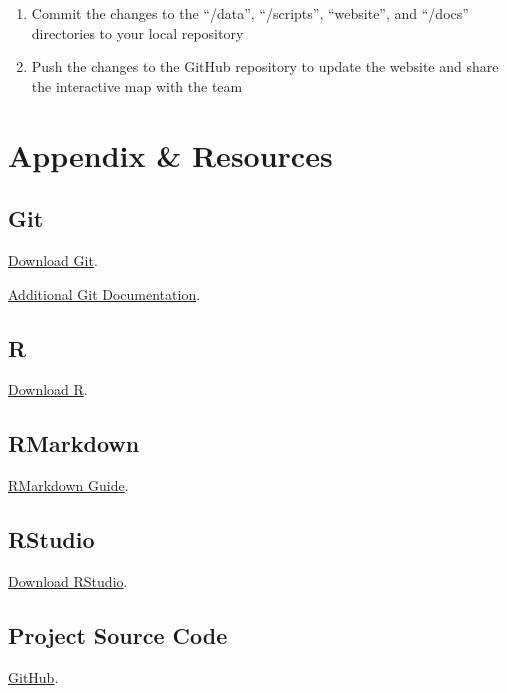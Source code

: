 \documentclass[
]{book}
\begin{document}
\begin{enumerate}
\item
  Commit the changes to the ``/data'', ``/scripts'', ``website'', and ``/docs'' directories to your local repository
\item
  Push the changes to the GitHub repository to update the website and share the interactive map with the team
\end{enumerate}

\hypertarget{appendix-resources}{%
\chapter*{Appendix \& Resources}\label{appendix-resources}}

\hypertarget{git}{%
\section*{Git}\label{git}}

\href{https://git-scm.com/downloads}{Download Git}.

\href{https://git-scm.com/doc}{Additional Git Documentation}.

\hypertarget{r}{%
\section*{R}\label{r}}

\href{https://cloud.r-project.org/}{Download R}.

\hypertarget{rmarkdown}{%
\section*{RMarkdown}\label{rmarkdown}}

\href{https://bookdown.org/yihui/rmarkdown/}{RMarkdown Guide}.

\hypertarget{rstudio}{%
\section*{RStudio}\label{rstudio}}

\href{https://rstudio.com/products/rstudio/download/\#download}{Download RStudio}.

\hypertarget{project-source-code}{%
\section*{Project Source Code}\label{project-source-code}}

\href{https://github.com/Peter-Kedron/COVID-19-Digital-Contact-Tracing-and-Geospatial-Technologies-and-Privacy}{GitHub}.

  
\end{document}
